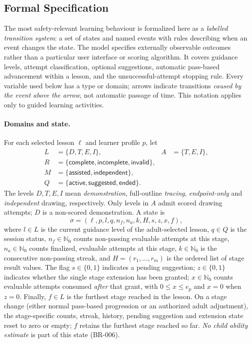 \documentclass[12pt]{article}
\renewcommand{\_}{\textunderscore\allowbreak}%
\begin{document}
\subsection{Formal Specification}
\label{sec:fr-formal}

The most safety-relevant learning behaviour is formalized here as a
\emph{labelled transition system}: a set of states and named events with rules
describing when an event changes the state. The model specifies externally
observable outcomes rather than a particular user interface or scoring
algorithm. It covers guidance levels, attempt classification, optional
suggestions, automatic pass-based advancement within a lesson, and the
unsuccessful-attempt stopping rule. Every variable used below has a type or
domain; arrows indicate transitions \emph{caused by the event above the arrow},
not automatic passage of time. This notation applies only to guided learning
activities.

\paragraph{Domains and state.}
For each selected lesson $\ell$ and learner profile $p$, let
\[
\begin{aligned}
L &= \{D,T,E,I\}, & A &= \{T,E,I\},\\
R &= \{\textsf{complete},\textsf{incomplete},\textsf{invalid}\},\\
M &= \{\textsf{assisted},\textsf{independent}\},\\
Q &= \{\textsf{active},\textsf{suggested},\textsf{ended}\}.
\end{aligned}
\]
The levels $D,T,E,I$ mean \emph{demonstration}, full-outline \emph{tracing},
\emph{endpoint-only} and \emph{independent} drawing, respectively. Only levels
in $A$ admit scored drawing attempts; $D$ is a non-scored demonstration. A state
is
\[
\sigma=(\ell,p,l,q,n_f,n_a,k,H,s,z,x,f),
\]
where $l\in L$ is the current guidance level of the adult-selected lesson, $q\in
Q$ is the session status, $n_f\in\mathbb{N}_0$ counts non-passing evaluable
attempts at this stage, $n_a\in\mathbb{N}_0$ counts finalized, evaluable
attempts at this stage, $k\in\mathbb{N}_0$ is the consecutive non-passing
streak, and $H=(r_1,\ldots,r_m)$ is the ordered list of stage result values. The
flag $s\in\{0,1\}$ indicates a pending suggestion; $z\in\{0,1\}$ indicates
whether the single stage extension has been granted; $x\in\mathbb{N}_0$ counts
evaluable attempts consumed \emph{after} that grant, with $0\le x\le e_p$ and
$x=0$ when $z=0$. Finally, $f\in L$ is the furthest stage reached in the lesson.
On a stage change (either normal pass-based progression or an authorized adult
adjustment), the stage-specific counts, streak, history, pending suggestion and
extension state reset to zero or empty; $f$ retains the furthest stage reached
so far. \emph{No child ability estimate} is part of this state (BR-006).
\end{document}
